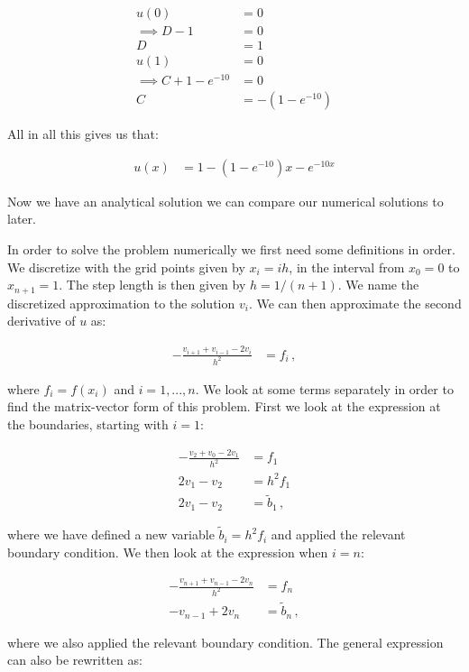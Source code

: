 \documentclass[english,notitlepage,reprint,nofootinbib]{revtex4-1}  %
\begin{document}
\begin{align*}
u(0) &= 0 \\
\implies D - 1 &= 0 \\
D &= 1 \\
u(1) &= 0 \\
\implies C + 1 - e^{-10} &= 0 \\
C &= -(1 - e^{-10})
\end{align*}

All in all this gives us that:

\begin{align*}
u(x) &= 1 - (1 - e^{-10}) x - e^{-10x}
\end{align*}

Now we have an analytical solution we can compare our numerical solutions to later.

In order to solve the problem numerically we first need some definitions in order. We discretize with the grid points given by $x_i = ih$, in the interval from $x_0 = 0$ to $x_{n+1} = 1$. The step length is then given by $h = 1/(n+1)$. We name the discretized approximation to the solution $v_i$. We can then approximate the second derivative of $u$ as:

\begin{align*}
- \frac{v_{i+1} + v_{i-1} - 2v_i}{h^2} &= f_i \, ,
\end{align*}

where $f_i = f(x_i)$ and $i = 1,...,n$. We look at some terms separately in order to find the matrix-vector form of this problem. First we look at the expression at the boundaries, starting with $i=1$:

\begin{align*}
-\frac{v_2 + v_0 - 2v_1}{h^2} &= f_1 \\
2v_1 - v_2 &= h^2 f_1 \\
2v_1 - v_2 &= \tilde{b}_1 \, ,
\end{align*}

where we have defined a new variable $\tilde{b}_i = h^2 f_i$ and applied the relevant boundary condition. We then look at the expression when $i=n$:

\begin{align*}
-\frac{v_{n+1} + v_{n-1} - 2v_{n}}{h^2} &= f_n \\
-v_{n-1} + 2v_n &= \tilde{b}_n \, ,
\end{align*}

where we also applied the relevant boundary condition. The general expression can also be rewritten as:
\end{document}
